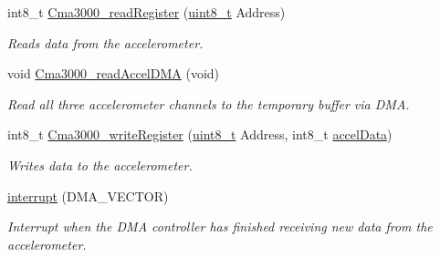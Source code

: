 \begin{DoxyCompactItemize}
int8\-\_\-t \hyperlink{group__HAL__Cma3000_ga3de7d450377baf2c888e76f419cfc21e}{\-Cma3000\-\_\-read\-Register} (\hyperlink{typedefs_8h_aba7bc1797add20fe3efdf37ced1182c5}{uint8\-\_\-t} \-Address)
\begin{DoxyCompactList}\small\item\em \-Reads data from the accelerometer. \end{DoxyCompactList}\item 
void \hyperlink{group__HAL__Cma3000_ga7be472db252aa760998fd4f155f2c132}{\-Cma3000\-\_\-read\-Accel\-D\-M\-A} (void)
\begin{DoxyCompactList}\small\item\em \-Read all three accelerometer channels to the temporary buffer via \-D\-M\-A. \end{DoxyCompactList}\item 
int8\-\_\-t \hyperlink{group__HAL__Cma3000_gafc0c3a516edbfc2e87c514b51b595678}{\-Cma3000\-\_\-write\-Register} (\hyperlink{typedefs_8h_aba7bc1797add20fe3efdf37ced1182c5}{uint8\-\_\-t} \-Address, int8\-\_\-t \hyperlink{group__HAL__Cma3000_ga2463200b1bea9027c65cd6a7988b92cc}{accel\-Data})
\begin{DoxyCompactList}\small\item\em \-Writes data to the accelerometer. \end{DoxyCompactList}\item 
\hyperlink{group__HAL__Cma3000_gac61bc22c3bb5b6ef2292d1e11e026861}{interrupt} (\-D\-M\-A\-\_\-\-V\-E\-C\-T\-O\-R)
\begin{DoxyCompactList}\small\item\em \-Interrupt when the \-D\-M\-A controller has finished receiving new data from the accelerometer. \end{DoxyCompactList}\end{DoxyCompactItemize}
